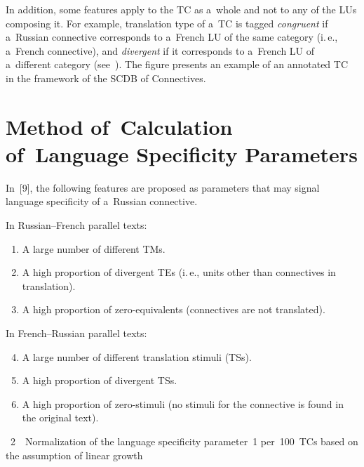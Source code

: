 \begin{multicols}{2}
  In addition, some features apply to the TC as a~whole and not to any of the LUs 
composing it. For example, translation type of a~TC is tagged \textit{congruent} if 
a~Russian connective corresponds to a~French LU of the same category (i.\,e., a~French 
connective), and \textit{divergent} if it corresponds to a~French LU of a~different 
category (see~\cite[p.~23--25]{8-in}). The figure presents an example of an annotated 
TC in the framework of the SCDB of Connectives.
  
  
  
  \section{Method of~Calculation of~Language Specificity Parameters}
  
  \noindent
  In~[9], the following features are proposed as parameters that may signal language 
specificity of a~Russian connective.
  
  In Russian--French parallel texts:
  \begin{enumerate}[1.]
\item A large number of different TMs.\\[-14pt]
\item A high proportion of divergent TEs (i.\,e., units other 
than connectives in translation).\\[-14pt]
\item A high proportion of zero-equivalents (connectives are not translated).
\end{enumerate}

  In French--Russian parallel texts: 
  \begin{enumerate}[1.]
  \setcounter{enumi}{3}
\item A large number of different translation stimuli (TSs).\\[-14pt]
\item A high proportion of divergent TSs.\\[-14pt]
\item A high proportion of zero-stimuli (no stimuli for the connective is found 
in the original text).
\end{enumerate}


{\small %
 \vspace*{9pt} 
  
  \noindent
{{\tablename~2}\ \ \small{Normalization of the language specificity parameter~1 per~100~TCs 
based on the assumption of linear growth}}

}
\end{multicols}
